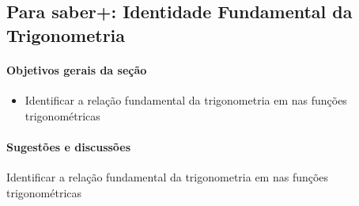 \begin{texto}
{
\subsection{Para saber+: Identidade Fundamental da Trigonometria}
\paragraph{Objetivos gerais da seção}
\begin{itemize}
\item Identificar a relação fundamental da trigonometria em nas
funções trigonométricas
\end{itemize}
\paragraph{Sugestões e discussões}
Identificar a relação fundamental da trigonometria em nas
funções trigonométricas
}
\end{texto}

\exercise
{}\label{trig-exercises1}

